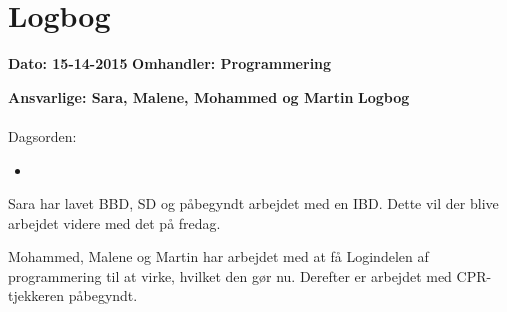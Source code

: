\chapter{Logbog}

\textbf{Dato: 15-14-2015} 
\textbf{Omhandler: Programmering} 

\textbf{Ansvarlige: Sara, Malene, Mohammed og Martin} 
\textbf{Logbog}
\\
\\
Dagsorden:
\begin{itemize}
-	Arbejde med diagrammer
-	Systembeskrivelse
-	Arbejde med Trelags-modellen
\item 
\end{itemize}

Sara har lavet BBD, SD og påbegyndt arbejdet med
en IBD. Dette vil der blive arbejdet videre med det på fredag.

Mohammed, Malene og Martin har arbejdet med at få Logindelen af programmering til at virke, hvilket den gør nu. Derefter er arbejdet med CPR-tjekkeren påbegyndt.
